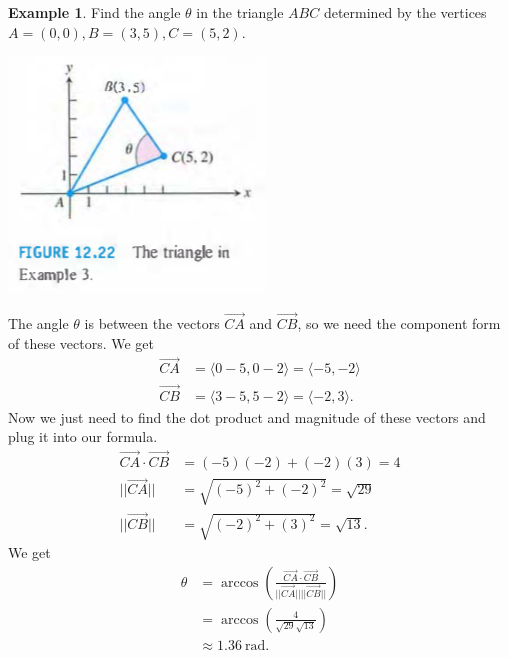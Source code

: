 \documentclass[12pt, letter]{article}
\theoremstyle{plain}
\numberwithin{theorem}{section}
\theoremstyle{definition}
\newtheorem{example}[theorem]{Example}
\begin{document}
\hrulefill

\bigskip

\begin{example}
Find the angle $\theta$ in the triangle $ABC$ determined by the vertices $A=(0,0), B = (3,5), C=(5,2)$.

\bigskip

\begin{center}
\includegraphics[scale=0.8]{m1_f8}
\end{center}

\bigskip
The angle $\theta$ is between the vectors $\vec{CA}$ and $\vec{CB}$, so we need the component form of these vectors. We get
\begin{align*}
\vec{CA} &= \langle 0-5, 0-2 \rangle = \langle -5, -2 \rangle\\
\vec{CB} &= \langle 3-5, 5-2 \rangle = \langle -2, 3 \rangle.
\end{align*}
Now we just need to find the dot product and magnitude of these vectors and plug it into our formula.
\begin{align*}
\vec{CA} \cdot \vec{CB} &= (-5)(-2)+(-2)(3) = 4\\
||\vec{CA}|| &= \sqrt{(-5)^2+(-2)^2} = \sqrt{29}\\
||\vec{CB}|| &= \sqrt{(-2)^2+(3)^2} = \sqrt{13}.
\end{align*}
We get
\begin{align*}
\theta &= \arccos\left(\frac{\vec{CA} \cdot \vec{CB}}{||\vec{CA}|| ||\vec{CB}||}\right)\\
&= \arccos\left(\frac{4}{\sqrt{29}\sqrt{13}}\right)\\
&\approx 1.36 \ \text{rad}.
\end{align*}
\end{example}

\bigskip

\hrulefill

\bigskip
\end{document}

